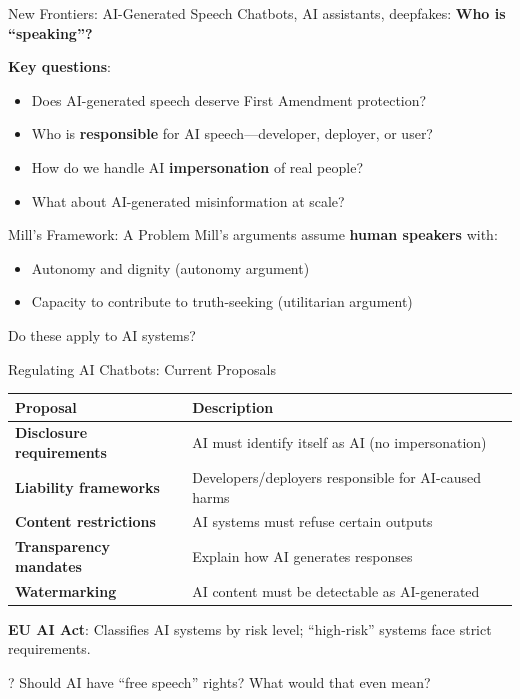 ﻿\documentclass[aspectratio=169]{beamer}
\begin{document}
\begin{frame}{New Frontiers: AI-Generated Speech}
Chatbots, AI assistants, deepfakes: \textbf{Who is ``speaking''?}

\vspace{0.3cm}
\textbf{Key questions}:
\begin{itemize}
    \item Does AI-generated speech deserve First Amendment protection?
    \item Who is \textbf{responsible} for AI speech---developer, deployer, or user?
    \item How do we handle AI \textbf{impersonation} of real people?
    \item What about AI-generated misinformation at scale?
\end{itemize}

\vspace{0.3cm}
\begin{alertblock}{Mill's Framework: A Problem}
Mill's arguments assume \textbf{human speakers} with:
\begin{itemize}
    \item Autonomy and dignity (autonomy argument)
    \item Capacity to contribute to truth-seeking (utilitarian argument)
\end{itemize}
Do these apply to AI systems?
\end{alertblock}
\end{frame}

\begin{frame}{Regulating AI Chatbots: Current Proposals}
\begin{table}[h]
\centering
\small
\begin{tabular}{>{\bfseries}l p{7cm}}
\toprule
Proposal & Description \\
\midrule
Disclosure requirements & AI must identify itself as AI (no impersonation) \\
Liability frameworks & Developers/deployers responsible for AI-caused harms \\
Content restrictions & AI systems must refuse certain outputs \\
Transparency mandates & Explain how AI generates responses \\
Watermarking & AI content must be detectable as AI-generated \\
\bottomrule
\end{tabular}
\end{table}

\vspace{0.2cm}
\textbf{EU AI Act}: Classifies AI systems by risk level; ``high-risk'' systems face strict requirements.

\begin{alertblock}{?}
Should AI have ``free speech'' rights? What would that even mean?
\end{alertblock}
\end{frame}
\end{document}
